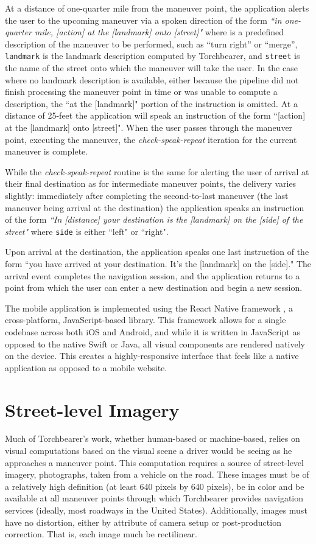 At a distance of one-quarter mile from the maneuver point, the application alerts the user to the upcoming maneuver via a spoken direction of the form \textit{``in one-quarter mile, [action] at the [landmark] onto [street]"} where  is a predefined description of the maneuver to be performed, such as “turn right” or “merge”, \texttt{landmark} is the landmark description computed by Torchbearer, and \texttt{street} is the name of the street onto which the maneuver will take the user. In the case where no landmark description is available, either because the pipeline did not finish processing the maneuver point in time or was unable to compute a description, the ``at the [landmark]" portion of the instruction is omitted. At a distance of 25-feet the application will speak an instruction of the form ``[action] at the [landmark] onto [street]". When the user passes through the maneuver point, executing the maneuver, the \textit{check-speak-repeat} iteration for the current maneuver is complete.

While the \textit{check-speak-repeat} routine is the same for alerting the user of arrival at their final destination as for intermediate maneuver points, the delivery varies slightly: immediately after completing the second-to-last maneuver (the last maneuver being arrival at the destination) the application speaks an instruction of the form \textit{``In [distance] your destination is the [landmark] on the [side] of the street"} where \texttt{side} is either ``left" or ``right".

Upon arrival at the destination, the application speaks one last instruction of the form ``you have arrived at your destination. It's the [landmark] on the [side]." The arrival event completes the navigation session, and the application returns to a point from which the user can enter a new destination and begin a new session.

The mobile application is implemented using the React Native framework \cite{reactNative}, a cross-platform, JavaScript-based library. This framework allows for a single codebase across both iOS and  Android, and while it is written in JavaScript as opposed to the native Swift or Java, all visual components are rendered natively on the device. This creates a highly-responsive interface that feels like a native application as opposed to a mobile website. 

\section{Street-level Imagery}
Much of Torchbearer's work, whether human-based or machine-based, relies on visual computations based on the visual scene a driver would be seeing as he approaches a maneuver point. This computation requires a source of street-level imagery, photographs, taken from a vehicle on the road. These images must be of a relatively high definition (at least 640 pixels by 640 pixels), be in color and be available at all maneuver points through which Torchbearer provides navigation services (ideally, most roadways in the United States). Additionally, images must have no distortion, either by attribute of camera setup or post-production correction. That is, each image much be rectilinear.

